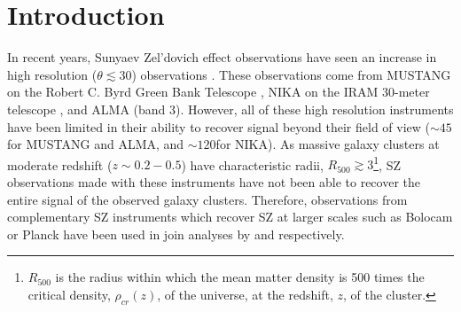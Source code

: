 \documentclass[onecolumn,traditabstract]{aa}
\begin{document}

\maketitle

\section{Introduction}
\label{sec:intro}



In recent years, Sunyaev Zel'dovich \citep[SZ,][]{sunyaev1970,sunyaev1972}
effect observations have seen an increase in high resolution ($\theta \lesssim 30$\asecs)
observations \citep[e.g.,][]{mason2010,adam2014,kitayama2016}. These observations come from MUSTANG on the
Robert C. Byrd Green Bank Telescope \citep[GBT][]{dicker2008}, NIKA on the IRAM 30-meter telescope \citep{monfardini2010},
and ALMA (band 3). However, all of these high resolution instruments have been limited in their ability to
recover signal beyond their field of view ($\sim 45$\asecs for MUSTANG and ALMA, and $\sim 120$\asecs for NIKA). As massive
galaxy clusters at moderate redshift ($z \sim 0.2-0.5$) have characteristic radii,
$R_{500} \gtrsim 3$\amin\footnote{$R_{500}$ is the radius within which the mean matter density is 500 times the
  critical density, $\rho_{cr}(z)$, of the universe, at the redshift, $z$, of the cluster.},
SZ observations made with these instruments have not been able to recover the
entire signal of the observed galaxy clusters. Therefore, observations from complementary SZ instruments which recover SZ at larger scales
such as Bolocam \citet{czakon2015} or Planck \citep{planck2013a} have been used in join analyses by
\citet{romero2015a} and \citet{adam2015,adam2016a} respectively.
\end{document}
